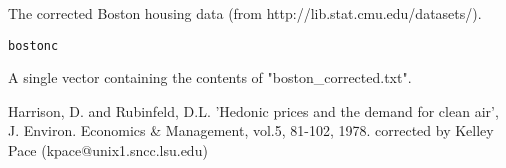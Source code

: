 \begin{Description}\relax
The corrected Boston housing data (from http://lib.stat.cmu.edu/datasets/).
\end{Description}
\begin{Usage}
\begin{verbatim}bostonc\end{verbatim}
\end{Usage}
\begin{Format}\relax
A single vector containing the contents of "boston\_corrected.txt".
\end{Format}
\begin{Source}\relax
Harrison, D. and Rubinfeld, D.L. 'Hedonic prices and the demand for clean air', J. Environ. Economics \& Management, vol.5, 81-102, 1978.
corrected by Kelley Pace (kpace@unix1.sncc.lsu.edu)
\end{Source}

